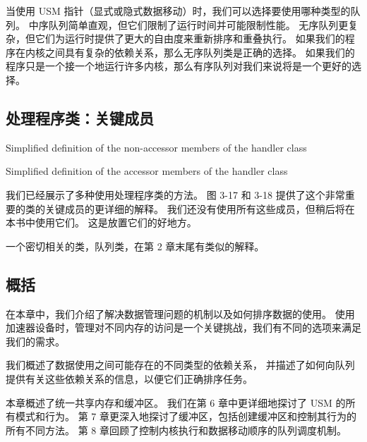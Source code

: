 当使用 USM 指针（显式或隐式数据移动）时，我们可以选择要使用哪种类型的队列。 
中序队列简单直观，但它们限制了运行时间并可能限制性能。 
无序队列更复杂，但它们为运行时提供了更大的自由度来重新排序和重叠执行。 
如果我们的程序在内核之间具有复杂的依赖关系，那么无序队列类是正确的选择。 
如果我们的程序只是一个接一个地运行许多内核，那么有序队列对我们来说将是一个更好的选择。

\subsection{处理程序类：关键成员}
{\color{red} Simplified definition of the non-accessor members of the handler class}

{\color{red} Simplified definition of the accessor members of the handler class}

我们已经展示了多种使用处理程序类的方法。 图 3-17 和 3-18 提供了这个非常重要的类的关键成员的更详细的解释。 
我们还没有使用所有这些成员，但稍后将在本书中使用它们。 这是放置它们的好地方。

一个密切相关的类，队列类，在第 2 章末尾有类似的解释。

\subsection{概括}
在本章中，我们介绍了解决数据管理问题的机制以及如何排序数据的使用。 
使用加速器设备时，管理对不同内存的访问是一个关键挑战，我们有不同的选项来满足我们的需求。

我们概述了数据使用之间可能存在的不同类型的依赖关系，
并描述了如何向队列提供有关这些依赖关系的信息，以便它们正确排序任务。

本章概述了统一共享内存和缓冲区。 我们在第 6 章中更详细地探讨了 USM 的所有模式和行为。
第 7 章更深入地探讨了缓冲区，包括创建缓冲区和控制其行为的所有不同方法。 
第 8 章回顾了控制内核执行和数据移动顺序的队列调度机制。
